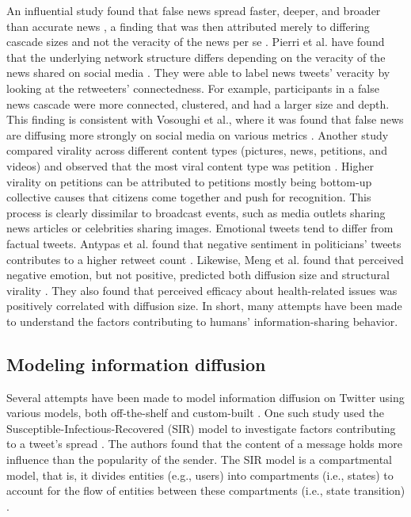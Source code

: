 \documentclass[11pt,a4paper]{article}
\begin{document}
    An influential study found that false news spread faster, deeper, and broader than accurate news \cite{vosoughi_spread_2018}, a finding that was then attributed merely to differing cascade sizes and not the veracity of the news per se \cite{juul_comparing_2021}. Pierri et al. have found that the underlying network structure differs depending on the veracity of the news shared on social media \cite{pierri_topology_2020}. They were able to label news tweets' veracity by looking at the retweeters' connectedness. For example, participants in a false news cascade were more connected, clustered, and had a larger size and depth. This finding is consistent with Vosoughi et al., where it was found that false news are diffusing more strongly on social media on various metrics \cite{vosoughi_spread_2018}. Another study compared virality across different content types (pictures, news, petitions, and videos) and observed that the most viral content type was petition \cite{goel_structural_2016}. Higher virality on petitions can be attributed to petitions mostly being bottom-up collective causes that citizens come together and push for recognition. This process is clearly dissimilar to broadcast events, such as media outlets sharing news articles or celebrities sharing images. Emotional tweets tend to differ from factual tweets. Antypas et al. found that negative sentiment in politicians' tweets contributes to a higher retweet count \cite{antypas_negativity_2023}. Likewise, Meng et al. found that perceived negative emotion, but not positive, predicted both diffusion size and structural virality \cite{meng_diffusion_2018}. They also found that perceived efficacy about health-related issues was positively correlated with diffusion size. In short, many attempts have been made to understand the factors contributing to humans' information-sharing behavior.    
    \subsection{Modeling information diffusion}
        Several attempts have been made to model information diffusion on Twitter using various models, both off-the-shelf and custom-built \cite{abdullah_epidemic_2011,hao_retweeting_2013}. One such study used the Susceptible-Infectious-Recovered (SIR) model to investigate factors contributing to a tweet's spread \cite{zheng_factors_2018}. The authors found that the content of a message holds more influence than the popularity of the sender. The SIR model is a compartmental model, that is, it divides entities (e.g., users) into compartments (i.e., states) to account for the flow of entities between these compartments (i.e., state transition) \cite{kermack_contribution_1927}.
        
\end{document}
